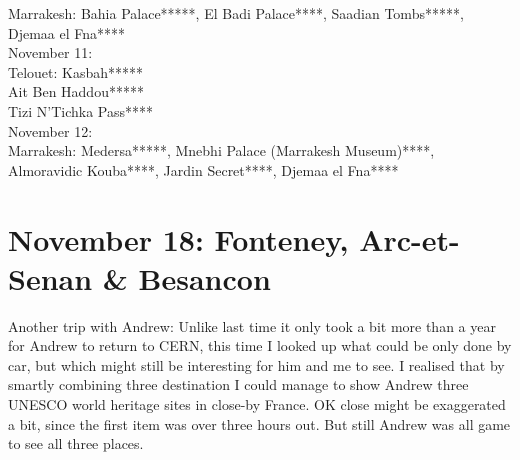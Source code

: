 Marrakesh: Bahia Palace*****, El Badi Palace****, Saadian Tombs*****, Djemaa el Fna****\\

November 11:\\
Telouet: Kasbah*****\\
Ait Ben Haddou*****\\
Tizi N'Tichka Pass****\\

November 12:\\
Marrakesh: Medersa*****, Mnebhi Palace (Marrakesh Museum)****, Almoravidic Kouba****, Jardin Secret****, Djemaa el Fna****

\section{November 18: Fonteney, Arc-et-Senan \& Besancon}
\label{Nov18}

Another trip with Andrew: Unlike last time it only took a bit more than a year for Andrew to return to CERN, this time I looked up what could be only done by car, but which might still be interesting for him and me to see. I realised that by smartly combining three destination I could manage to show Andrew three UNESCO world heritage sites in close-by France. OK close might be exaggerated a bit, since the first item was over three hours out. But still Andrew was all game to see all three places.\\

